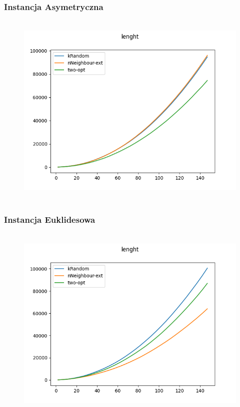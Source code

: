 \documentclass[11pt]{article}
\begin{document}
\subsubsection{Instancja Asymetryczna }
            \begin{center}
            \begin{figure}[H]

                \\ \includegraphics[scale=0.6]{images/lenght_asym_time.png}\

            \end{figure}
            \end{center}
\subsubsection{Instancja Euklidesowa }
            \begin{center}
            \begin{figure}[H]

                \\ \includegraphics[scale=0.6]{images/lenght_euc_time.png}\

            \end{figure}
            \end{center}
\end{document}
